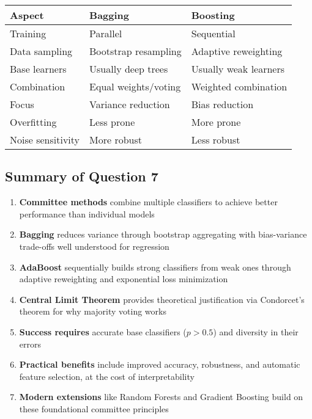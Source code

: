 \documentclass[12pt,a4paper]{article}
\begin{document}
\begin{table}[h]
\centering
\begin{tabular}{|l|l|l|}
\hline
\textbf{Aspect} & \textbf{Bagging} & \textbf{Boosting} \\
\hline
Training & Parallel & Sequential \\
\hline
Data sampling & Bootstrap resampling & Adaptive reweighting \\
\hline
Base learners & Usually deep trees & Usually weak learners \\
\hline
Combination & Equal weights/voting & Weighted combination \\
\hline
Focus & Variance reduction & Bias reduction \\
\hline
Overfitting & Less prone & More prone \\
\hline
Noise sensitivity & More robust & Less robust \\
\hline
\end{tabular}
\end{table}

\subsection{Summary of Question 7}

\begin{enumerate}
    \item \textbf{Committee methods} combine multiple classifiers to achieve better performance than individual models
    \item \textbf{Bagging} reduces variance through bootstrap aggregating with bias-variance trade-offs well understood for regression
    \item \textbf{AdaBoost} sequentially builds strong classifiers from weak ones through adaptive reweighting and exponential loss minimization
    \item \textbf{Central Limit Theorem} provides theoretical justification via Condorcet's theorem for why majority voting works
    \item \textbf{Success requires} accurate base classifiers ($p > 0.5$) and diversity in their errors
    \item \textbf{Practical benefits} include improved accuracy, robustness, and automatic feature selection, at the cost of interpretability
    \item \textbf{Modern extensions} like Random Forests and Gradient Boosting build on these foundational committee principles
\end{enumerate}
\end{document}

